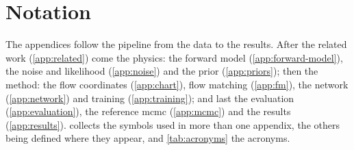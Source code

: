 \section{Notation}
\label{app:notation}

The appendices follow the pipeline from the data to the results. After the related work
(\cref{app:related}) come the physics: the forward model (\cref{app:forward-model}), the noise and
likelihood (\cref{app:noise}) and the prior (\cref{app:priors}); then the method: the flow
coordinates (\cref{app:chart}), flow matching (\cref{app:fm}), the network (\cref{app:network})
and training (\cref{app:training}); and last the evaluation (\cref{app:evaluation}), the reference
\ac{mcmc} (\cref{app:mcmc}) and the results (\cref{app:results}).  collects
the symbols used in more than one appendix, the others being defined where they appear, and
\cref{tab:acronyms} the acronyms.

